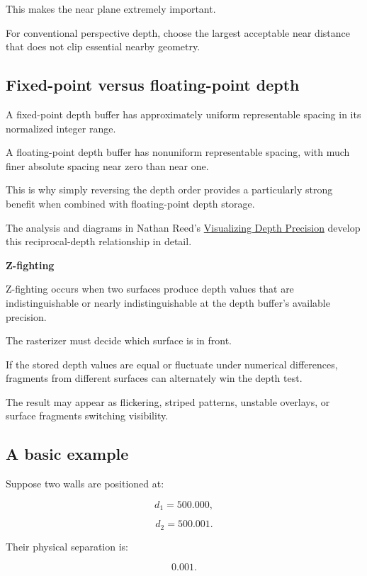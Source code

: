 This makes the near plane extremely important.

For conventional perspective depth, choose the largest acceptable near distance that does not clip essential nearby geometry.

\subsection{Fixed-point versus floating-point depth}\label{02-foundations-ii-ch033-fixed-point-versus-floating-point-depth}

A fixed-point depth buffer has approximately uniform representable spacing in its normalized integer range.

A floating-point depth buffer has nonuniform representable spacing, with much finer absolute spacing near zero than near one.

This is why simply reversing the depth order provides a particularly strong benefit when combined with floating-point depth storage.

The analysis and diagrams in Nathan Reed's \href{https://developer.nvidia.com/blog/visualizing-depth-precision/?utm_source=chatgpt.com}{Visualizing Depth Precision} develop this reciprocal-depth relationship in detail. 

\textbf{Z-fighting}

Z-fighting occurs when two surfaces produce depth values that are indistinguishable or nearly indistinguishable at the depth buffer's available precision.

The rasterizer must decide which surface is in front.

If the stored depth values are equal or fluctuate under numerical differences, fragments from different surfaces can alternately win the depth test.

The result may appear as flickering, striped patterns, unstable overlays, or surface fragments switching visibility.

\subsection{A basic example}\label{02-foundations-ii-ch033-a-basic-example}

Suppose two walls are positioned at:

\[
 d_1=500.000,
\]

\[
 d_2=500.001.
\]

Their physical separation is:

\[
 0.001.
\]

